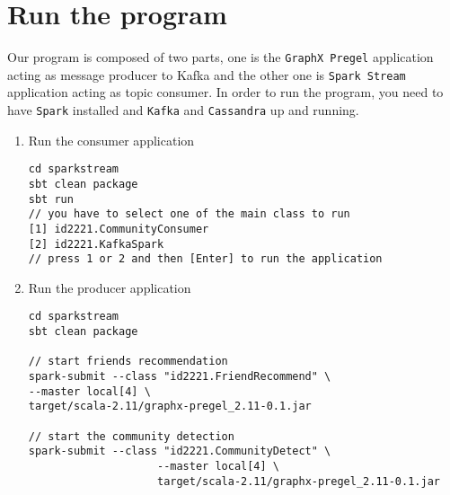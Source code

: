 \documentclass[12pt]{article}
\begin{document}
\section{Run the program}
Our program is composed of two parts, one is the \texttt{GraphX Pregel} application acting as message producer to Kafka and the other one is \texttt{Spark Stream} application acting as topic consumer.
In order to run the program, you need to have \texttt{Spark} installed and \texttt{Kafka} and \texttt{Cassandra} up and running.
\begin{enumerate}
\item Run the consumer application
\begin{verbatim}
cd sparkstream
sbt clean package
sbt run
// you have to select one of the main class to run
[1] id2221.CommunityConsumer
[2] id2221.KafkaSpark
// press 1 or 2 and then [Enter] to run the application
\end{verbatim}
\item Run the producer application
\begin{verbatim}
cd sparkstream
sbt clean package

// start friends recommendation
spark-submit --class "id2221.FriendRecommend" \
--master local[4] \
target/scala-2.11/graphx-pregel_2.11-0.1.jar

// start the community detection
spark-submit --class "id2221.CommunityDetect" \
					--master local[4] \
					target/scala-2.11/graphx-pregel_2.11-0.1.jar
\end{verbatim}
\end{enumerate}
\end{document}
